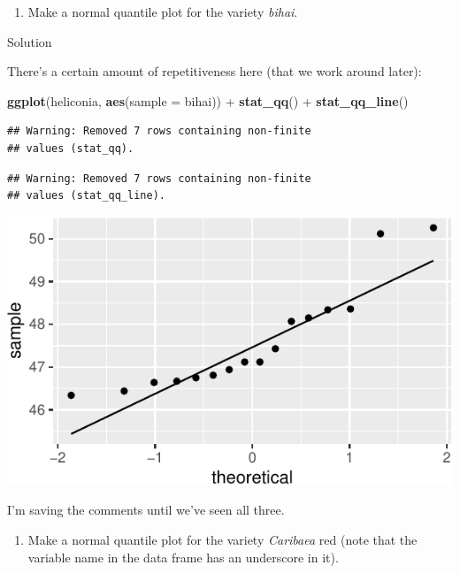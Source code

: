\documentclass[]{tufte-book}
\newenvironment{Shaded}{}{}
\newcommand{\DataTypeTok}[1]{\textcolor[rgb]{0.56,0.13,0.00}{#1}}
\newcommand{\KeywordTok}[1]{\textcolor[rgb]{0.00,0.44,0.13}{\textbf{#1}}}
\newcommand{\NormalTok}[1]{#1}
\newcommand{\OperatorTok}[1]{\textcolor[rgb]{0.40,0.40,0.40}{#1}}
\newcommand{\StringTok}[1]{\textcolor[rgb]{0.25,0.44,0.63}{#1}}
\providecommand{\tightlist}{%
  \setlength{\itemsep}{0pt}\setlength{\parskip}{0pt}}
\theoremstyle{definition}
\theoremstyle{definition}
\theoremstyle{definition}
\theoremstyle{remark}
\begin{document}
\begin{enumerate}
\def\labelenumi{(\alph{enumi})}
\setcounter{enumi}{1}
\tightlist
\item
  Make a normal quantile plot for the variety \emph{bihai}.
\end{enumerate}

Solution

There's a certain amount of repetitiveness here (that we work around
later):

\begin{Shaded}
\begin{Highlighting}[]
\KeywordTok{ggplot}\NormalTok{(heliconia, }\KeywordTok{aes}\NormalTok{(}\DataTypeTok{sample =}\NormalTok{ bihai)) }\OperatorTok{+}\StringTok{ }\KeywordTok{stat_qq}\NormalTok{() }\OperatorTok{+}\StringTok{ }
\StringTok{    }\KeywordTok{stat_qq_line}\NormalTok{()}
\end{Highlighting}
\end{Shaded}

\begin{verbatim}
## Warning: Removed 7 rows containing non-finite
## values (stat_qq).
\end{verbatim}

\begin{verbatim}
## Warning: Removed 7 rows containing non-finite
## values (stat_qq_line).
\end{verbatim}

\includegraphics{09-normal-quantile_files/figure-latex/unnamed-chunk-4-1}

I'm saving the comments until we've seen all three.

\begin{enumerate}
\def\labelenumi{(\alph{enumi})}
\setcounter{enumi}{2}
\tightlist
\item
  Make a normal quantile plot for the variety \emph{Caribaea} red (note
  that the variable name in the data frame has an underscore in it).
\end{enumerate}
\end{document}
